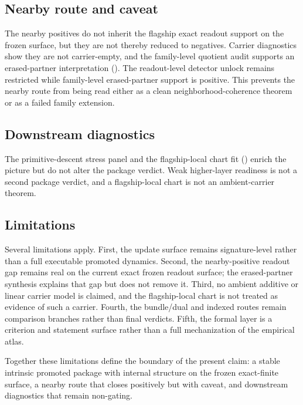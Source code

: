 \documentclass[11pt]{article}
\theoremstyle{definition}
\begin{document}
\subsection{Nearby route and caveat}

The nearby positives do not inherit the flagship exact readout support on the frozen surface, but they are not thereby reduced to negatives. Carrier diagnostics show they are not carrier-empty, and the family-level quotient audit supports an erased-partner interpretation (). The readout-level detector unlock remains restricted while family-level erased-partner support is positive. This prevents the nearby route from being read either as a clean neighborhood-coherence theorem or as a failed family extension.

\subsection{Downstream diagnostics}

The primitive-descent stress panel and the flagship-local chart fit () enrich the picture but do not alter the package verdict. Weak higher-layer readiness is not a second package verdict, and a flagship-local chart is not an ambient-carrier theorem.

\subsection{Limitations}

Several limitations apply. First, the update surface remains signature-level rather than a full executable promoted dynamics. Second, the nearby-positive readout gap remains real on the current exact frozen readout surface; the erased-partner synthesis explains that gap but does not remove it. Third, no ambient additive or linear carrier model is claimed, and the flagship-local chart is not treated as evidence of such a carrier. Fourth, the bundle/dual and indexed routes remain comparison branches rather than final verdicts. Fifth, the formal layer is a criterion and statement surface rather than a full mechanization of the empirical atlas.

Together these limitations define the boundary of the present claim: a stable intrinsic promoted package with internal structure on the frozen exact-finite surface, a nearby route that closes positively but with caveat, and downstream diagnostics that remain non-gating.
\end{document}
